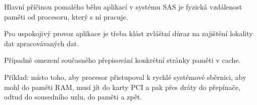 \begin{compactitem}
    \item {}
    \item {}

    \item Hlavní příčinou pomalého běhu aplikací v systému SAS je fyzická vzdálenost paměti od procesoru, který s ní pracuje.

    \item Pro uspokojivý provoz aplikace je třeba klást zvláštní důraz na zajištění lokality dat zpracovávaných dat.

    \item Případně omezení současného přepisování konkrétní stránky paměti v cache.

    \item Příklad: místo toho, aby procesor přistupoval k rychlé systémové sběrnici, aby mohl do paměti RAM, musí jít do karty PCI a pak přes dráty do přepínače, odtud do sousedního uzlu, do paměti a zpět.
\end{compactitem}
